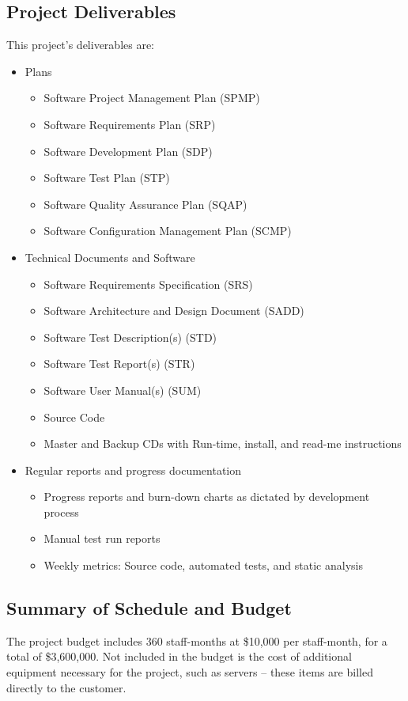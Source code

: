\documentclass[11pt]{article}
\begin{document}
\subsection{Project Deliverables}
This project's deliverables are:

\begin{itemize}
\item Plans
  \begin{itemize}
  \item Software Project Management Plan (SPMP)
  \item Software Requirements Plan (SRP)
  \item Software Development Plan (SDP)
  \item Software Test Plan (STP)
  \item Software Quality Assurance Plan (SQAP)
  \item Software Configuration Management Plan (SCMP)
  \end{itemize}
\item Technical Documents and Software
  \begin{itemize}
  \item Software Requirements Specification (SRS)
  \item Software Architecture and Design Document (SADD)
  \item Software Test Description(s) (STD)
  \item Software Test Report(s) (STR)
  \item Software User Manual(s) (SUM)
  \item Source Code
  \item Master and Backup CDs with Run-time, install, and read-me instructions
  \end{itemize}
\item Regular reports and progress documentation
  \begin{itemize}
  \item Progress reports and burn-down charts as dictated by development process
  \item Manual test run reports
  \item Weekly metrics: Source code, automated tests, and static analysis
  \end{itemize}
\end{itemize}


\subsection{Summary of Schedule and Budget}
The project budget includes 360 staff-months at \$10,000 per staff-month, for a total of
\$3,600,000.  Not included in the budget is the cost of additional equipment necessary for the
project, such as servers -- these items are billed directly to the customer.
\end{document}
